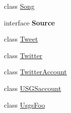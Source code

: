 \begin{DoxyCompactItemize}
class \mbox{\hyperlink{classbridges_1_1data__src__dependent_1_1_song}{Song}}
\item 
interface {\bfseries Source}
\item 
class \mbox{\hyperlink{classbridges_1_1data__src__dependent_1_1_tweet}{Tweet}}
\item 
class \mbox{\hyperlink{classbridges_1_1data__src__dependent_1_1_twitter}{Twitter}}
\item 
class \mbox{\hyperlink{classbridges_1_1data__src__dependent_1_1_twitter_account}{Twitter\+Account}}
\item 
class \mbox{\hyperlink{classbridges_1_1data__src__dependent_1_1_u_s_g_saccount}{U\+S\+G\+Saccount}}
\item 
class \mbox{\hyperlink{classbridges_1_1data__src__dependent_1_1_usgs_foo}{Usgs\+Foo}}
\end{DoxyCompactItemize}
